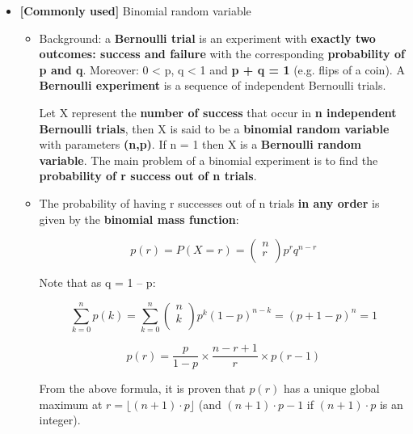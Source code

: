 \documentclass[12pt]{report}
\renewcommand{\_}{\kern-1.5pt\textunderscore\kern-1.5pt}
\begin{document}
\begin{itemize}
	\item \textbf{[Commonly used]} Binomial random variable\par

\begin{itemize}
	\item Background: a \textbf{Bernoulli trial }is an experiment with\textbf{ exactly two outcomes: success and failure} with the corresponding \textbf{probability of p and q}. Moreover: 0 < p, q < 1 and \textbf{p + q = 1} (e.g. flips of a coin). A \textbf{Bernoulli experiment} is a sequence of independent Bernoulli trials. \par

Let X represent the\textbf{ number of success} that occur in \textbf{n independent Bernoulli trials}, then X is said to be a \textbf{binomial random variable} with parameters \textbf{(n,p)}. If n = 1 then X is a \textbf{Bernoulli random variable}. The main problem of a binomial experiment is to find the \textbf{probability of r success out of n trials}. \par

	\item The probability of having r successes out of n trials\textbf{ in any order} is given by the \textbf{binomial mass function}:\par

 \[ p \left( r \right) =P \left( X=r \right) = \left( \begin{matrix}
n\\
r\\
\end{matrix}
 \right) p^{r}q^{n-r} \] \par

Note that as q = 1 – p: \par

 \[  \sum _{k=0}^{n}p \left( k \right) = \sum _{k=0}^{n} \left( \begin{matrix}
n\\
k\\
\end{matrix}
 \right) p^{k} \left( 1-p \right) ^{n-k}= \left( p+1-p \right) ^{n}=1 \] \par

 \[ p \left( r \right) =\frac{p}{1-p} \times \frac{n-r+1}{r} \times p \left( r-1 \right)  \] \par

From the above formula, it is proven that  \( p \left( r \right)  \)  has a unique global maximum at  \( r= \lfloor  \left( n+1 \right)  \cdot p \rfloor  \)  (and  \(  \left( n+1 \right)  \cdot p-1 \)  if  \(  \left( n+1 \right)  \cdot p \)  is an integer).\par


\end{itemize}
\end{itemize}
\end{document}
